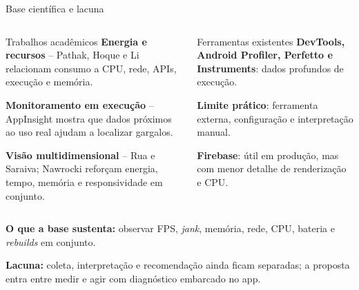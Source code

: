 \documentclass[aspectratio=169,10pt]{beamer}
\newcommand{\jank}{\textit{jank}}
\newcommand{\rebuilds}{\textit{rebuilds}}
\begin{document}
\begin{frame}{Base científica e lacuna}
\begin{columns}[T,onlytextwidth]
  \begin{accentbox}[fontupper=\scriptsize,top=0.8mm,bottom=0.8mm]{Trabalhos acadêmicos}
    \textbf{Energia e recursos} -- Pathak, Hoque e Li relacionam consumo a CPU, rede, APIs, execução e memória.\par
    \vspace{0.5mm}
    \textbf{Monitoramento em execução} -- AppInsight mostra que dados próximos ao uso real ajudam a localizar gargalos.\par
    \vspace{0.5mm}
    \textbf{Visão multidimensional} -- Rua e Saraiva; Nawrocki reforçam energia, tempo, memória e responsividade em conjunto.
  \end{accentbox}
  \begin{infobox}[fontupper=\scriptsize,top=0.8mm,bottom=0.8mm]{Ferramentas existentes}
    \textbf{DevTools, Android Profiler, Perfetto e Instruments}: dados profundos de execução.\par
    \vspace{0.5mm}
    \textbf{Limite prático}: ferramenta externa, configuração e interpretação manual.\par
    \vspace{0.5mm}
    \textbf{Firebase}: útil em produção, mas com menor detalhe de renderização e CPU.
  \end{infobox}
\end{columns}
\vspace{1mm}
\begin{tcolorbox}[width=\textwidth,colback=white,colframe=collectorTeal,boxrule=0.8pt,top=0.9mm,bottom=0.9mm]
  \textbf{O que a base sustenta:} observar FPS, \jank{}, memória, rede, CPU, bateria e \rebuilds{} em conjunto.\par
  \vspace{0.4mm}
  \textbf{Lacuna:} coleta, interpretação e recomendação ainda ficam separadas; a proposta entra entre medir e agir com diagnóstico embarcado no app.
\end{tcolorbox}
\end{frame}
\end{document}
